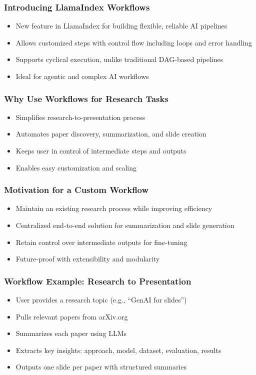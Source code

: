 \begin{frame}[fragile]\frametitle{Introducing LlamaIndex Workflows}
  \begin{itemize}
    \item New feature in LlamaIndex for building flexible, reliable AI pipelines
    \item Allows customized steps with control flow including loops and error handling
    \item Supports cyclical execution, unlike traditional DAG-based pipelines
    \item Ideal for agentic and complex AI workflows
  \end{itemize}
\end{frame}

\begin{frame}[fragile]\frametitle{Why Use Workflows for Research Tasks}
  \begin{itemize}
    \item Simplifies research-to-presentation process
    \item Automates paper discovery, summarization, and slide creation
    \item Keeps user in control of intermediate steps and outputs
    \item Enables easy customization and scaling
  \end{itemize}
\end{frame}

\begin{frame}[fragile]\frametitle{Motivation for a Custom Workflow}
  \begin{itemize}
    \item Maintain an existing research process while improving efficiency
    \item Centralized end-to-end solution for summarization and slide generation
    \item Retain control over intermediate outputs for fine-tuning
    \item Future-proof with extensibility and modularity
  \end{itemize}
\end{frame}

\begin{frame}[fragile]\frametitle{Workflow Example: Research to Presentation}
  \begin{itemize}
    \item User provides a research topic (e.g., “GenAI for slides”)
    \item Pulls relevant papers from arXiv.org
    \item Summarizes each paper using LLMs
    \item Extracts key insights: approach, model, dataset, evaluation, results
    \item Outputs one slide per paper with structured summaries
  \end{itemize}
\end{frame}

